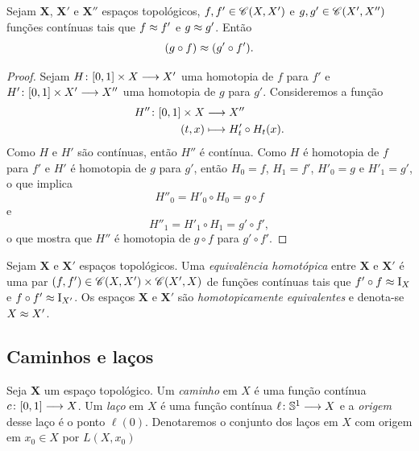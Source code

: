 \begin{proposition}
Sejam $\bm X$, $\bm X'$ e $\bm X''$ espaços topológicos, $f,f' \in \mathscr{C}(X,X')$ e $g,g' \in \mathscr{C}(X',X'')$ funções contínuas tais que $f \approx f'$ e $g \approx g'$. Então
	\begin{equation*}
	(g \circ f) \approx (g' \circ f').
	\end{equation*}
\end{proposition}
\begin{proof}
Sejam ${H}\colon {\left[{0},{1}\right] \times X} \longrightarrow {X'}$ uma homotopia de $f$ para $f'$ e ${H'}\colon {\left[{0},{1}\right] \times X'} \longrightarrow {X''}$ uma homotopia de $g$ para $g'$. Consideremos a função
	\begin{align*}
	{H''}\colon {\left[{0},{1}\right] \times X} &\longrightarrow {X''} \\{(t,x)} &\longmapsto H'_t \circ H_t(x).
	\end{align*}
Como $H$ e $H'$ são contínuas, então $H''$ é contínua. Como $H$ é homotopia de $f$ para $f'$ e $H'$ é homotopia de $g$ para $g'$, então $H_0 = f$, $H_1 = f'$, $H'_0 = g$ e $H'_1 = g'$, o que implica
	\begin{equation*}
	H''_0 = H'_0 \circ H_0 = g \circ f
	\end{equation*}
e
	\begin{equation*}
	H''_1 = H'_1 \circ H_1 = g' \circ f',
	\end{equation*}
o que mostra que $H''$ é homotopia de $g \circ f$ para $g' \circ f'$.
\end{proof}

\begin{definition}
Sejam $\bm X$ e $\bm X'$ espaços topológicos. Uma \emph{equivalência homotópica} entre $\bm X$ e $\bm X'$ é uma par $(f,f') \in \mathscr{C}(X,X') \times \mathscr{C}(X',X)$ de funções contínuas tais que $f' \circ f \approx \mathrm{I}_X$ e $f \circ f' \approx \mathrm{I}_{X'}$. Os espaços $\bm X$ e $\bm X'$ são \emph{homotopicamente equivalentes} e denota-se $X \approx X'$.
\end{definition}


\subsection{Caminhos e laços}

\begin{definition}
Seja $\bm X$ um espaço topológico. Um \textit{caminho} em $X$ é uma função contínua ${c}\colon {\left[{0},{1}\right]} \longrightarrow {X}$. Um \textit{laço} em $X$ é uma função contínua ${\ell}\colon {\mathbb{S}^1} \longrightarrow {X}$ e a \emph{origem} desse laço é o ponto $\ell(0)$. Denotaremos o conjunto dos laços em $X$ com origem em $x_0 \in X$ por $L(X,x_0)$
\end{definition}

